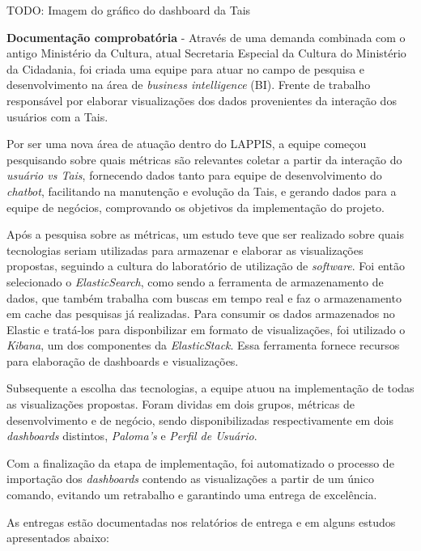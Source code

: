 TODO: Imagem do gráfico do dashboard da Tais

\textbf{Documentação comprobatória} - Através de uma demanda combinada
com o antigo Ministério da Cultura, atual Secretaria Especial da Cultura
do Ministério da Cidadania, foi criada uma equipe para atuar no campo de
pesquisa e desenvolvimento na área de \emph{business intelligence} (BI).
Frente de trabalho responsável por elaborar visualizações dos dados
provenientes da interação dos usuários com a Tais.

Por ser uma nova área de atuação dentro do LAPPIS, a equipe começou
pesquisando sobre quais métricas são relevantes coletar a partir da
interação do \emph{usuário vs Tais}, fornecendo dados tanto para equipe
de desenvolvimento do \emph{chatbot}, facilitando na manutenção e
evolução da Tais, e gerando dados para a equipe de negócios, comprovando
os objetivos da implementação do projeto.

Após a pesquisa sobre as métricas, um estudo teve que ser realizado
sobre quais tecnologias seriam utilizadas para armazenar e elaborar as
visualizações propostas, seguindo a cultura do laboratório de utilização
de \emph{software}. Foi então selecionado o \emph{ElasticSearch}, como
sendo a ferramenta de armazenamento de dados, que também trabalha com
buscas em tempo real e faz o armazenamento em cache das pesquisas já
realizadas. Para consumir os dados armazenados no Elastic e tratá-los
para disponbilizar em formato de visualizações, foi utilizado o
\emph{Kibana}, um dos componentes da \emph{ElasticStack}. Essa
ferramenta fornece recursos para elaboração de dashboards e
visualizações.

Subsequente a escolha das tecnologias, a equipe atuou na implementação
de todas as visualizações propostas. Foram dividas em dois grupos,
métricas de desenvolvimento e de negócio, sendo disponibilizadas
respectivamente em dois \emph{dashboards} distintos, \emph{Paloma's} e
\emph{Perfil de Usuário}.

Com a finalização da etapa de implementação, foi automatizado o processo
de importação dos \emph{dashboards} contendo as visualizações a partir
de um único comando, evitando um retrabalho e garantindo uma entrega de
excelência.

As entregas estão documentadas nos relatórios de entrega e em alguns
estudos apresentados abaixo:

